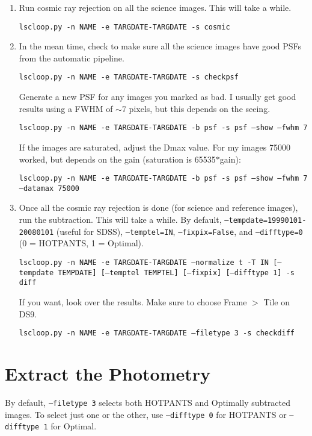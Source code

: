 \begin{enumerate}
\item Run cosmic ray rejection on all the science images. This will take a while.

{\tt lscloop.py -n NAME -e TARGDATE-TARGDATE -s cosmic}

\item In the mean time, check to make sure all the science images have good PSFs from the automatic pipeline.

{\tt lscloop.py -n NAME -e TARGDATE-TARGDATE -s checkpsf}

Generate a new PSF for any images you marked as bad. I usually get good results using a FWHM of $\sim 7$ pixels, but this depends on the seeing.

{\tt lscloop.py -n NAME -e TARGDATE-TARGDATE -b psf -s psf --show --fwhm 7}

If the images are saturated, adjust the Dmax value. For my images 75000 worked, but depends on the gain (saturation is 65535$*$gain):

{\tt \tt lscloop.py -n NAME -e TARGDATE-TARGDATE -b psf -s psf --show --fwhm 7 --datamax 75000}

\item Once all the cosmic ray rejection is done (for science and reference images), run the subtraction. This will take a while. By default, {\tt --tempdate=19990101-20080101} (useful for SDSS), {\tt --temptel=IN}, {\tt --fixpix=False}, and {\tt --difftype=0} (0 = HOTPANTS, 1 = Optimal).

{\tt lscloop.py -n NAME -e TARGDATE-TARGDATE --normalize t -T IN [--tempdate TEMPDATE] [--temptel TEMPTEL] [--fixpix] [--difftype 1] -s diff}

If you want, look over the results. Make sure to choose Frame $>$ Tile on DS9.

{\tt lscloop.py -n NAME -e TARGDATE-TARGDATE --filetype 3 -s checkdiff}
\end{enumerate}

\section{Extract the Photometry}
By default, {\tt --filetype 3} selects both HOTPANTS and Optimally subtracted images. To select just one or the other, use {\tt --difftype 0} for HOTPANTS or {\tt --difftype 1} for Optimal.

